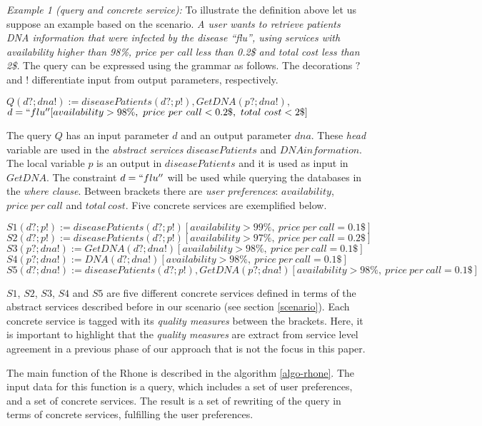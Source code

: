 \bigskip
\noindent \textit{Example 1 (query and concrete service):} To illustrate the definition above let us suppose an example based on the scenario. 
\textit{A user wants to retrieve patients DNA information that were infected by the disease ``flu'', using services with availability higher than 98\%, price per call less than 0.2\$ and total cost less than 2\$.}
The query can be expressed using the grammar as follows. The decorations $?$ and $!$ differentiate input from output parameters, respectively. 
\begin{center}
$Q(d?; dna!) := diseasePatients(d?; p!), GetDNA(p?; dna!),$
\\
$d = ``flu'' [availability > 98\%, \ price \ per \ call < 0.2\$, \ total \ cost < 2\$]$
\end{center}
The query $Q$ has an input parameter $d$ and an output parameter $dna$. 
These \textit{head} variable are used in the \textit{abstract services} $diseasePatients$ and $DNAinformation$. 
The local variable $p$ is an output in $diseasePatients$ and it is used as input in $GetDNA$.
The constraint $d = ``flu''$ will be used while querying the databases in the \textit{where clause}.
Between brackets there are \textit{user preferences}: $availability$, $price \ per \ call$ and $total \ cost$.
Five concrete services are exemplified below. 
\begin{flushleft}
\small
$S1(d?; p!) := diseasePatients(d?; p!)[availability > 99\%, \ price \ per \ call = 0.1\$]$ 
\\
$S2(d?; p!) := diseasePatients(d?; p!)[availability > 97\%, \ price \ per \ call = 0.2\$]$
\\
$S3(p?; dna!) := GetDNA(d?; dna!)[availability > 98\%, \ price \ per \ call = 0.1\$]$
\\
$S4(p?; dna!) := DNA(d?; dna!)[availability > 98\%, \ price \ per \ call = 0.1\$]$
\\
$S5(d?; dna!) := diseasePatients(d?; p!), GetDNA(p?; dna!)[availability > 98\%, \ price \ per \ call = 0.1\$]$
\end{flushleft}
$S1$, $S2$, $S3$, $S4$ and $S5$ are five different concrete services defined in terms of the abstract services described before in our scenario (see section \ref{scenario}). 
Each concrete service is tagged with its \textit{quality measures} between the brackets. 
Here, it is important to highlight that the \textit{quality measures} are extract from service level agreement in a previous phase of our approach that is not the focus in this paper.

\bigskip
The main function of the Rhone is described in the algorithm \ref{algo-rhone}. 
The input data for this function is a query, which includes a set of user preferences, and a set of concrete services. The result is a set of rewriting of the query in terms of concrete services, fulfilling the user preferences.

